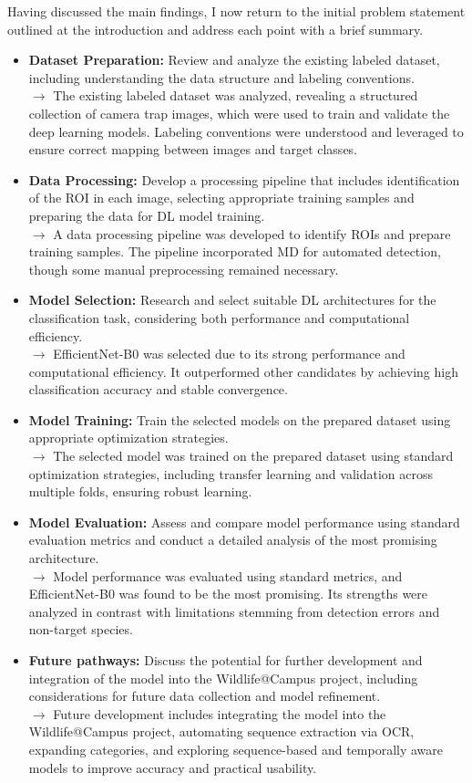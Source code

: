 Having discussed the main findings, I now return to the initial problem statement outlined at the introduction and address each point with a brief summary.
\begin{itemize}
    \item \textbf{Dataset Preparation:} Review and analyze the existing labeled dataset, including understanding the data structure and labeling conventions.\\
    $\rightarrow$ The existing labeled dataset was analyzed, revealing a structured collection of camera trap images, which were used to train and validate the deep learning models. Labeling conventions were understood and leveraged to ensure correct mapping between images and target classes.
    \item \textbf{Data Processing:} Develop a processing pipeline that includes identification of the \ac{ROI} in each image, selecting appropriate training samples and preparing the data for \ac{DL} model training.\\
    $\rightarrow$ A data processing pipeline was developed to identify \acp{ROI} and prepare training samples. The pipeline incorporated \ac{MD} for automated detection, though some manual preprocessing remained necessary.
    \item \textbf{Model Selection:} Research and select suitable \ac{DL} architectures for the classification task, considering both performance and computational efficiency.\\
    $\rightarrow$ EfficientNet-B0 was selected due to its strong performance and computational efficiency. It outperformed other candidates by achieving high classification accuracy and stable convergence.
    \item \textbf{Model Training:} Train the selected models on the prepared dataset using appropriate optimization strategies.\\
    $\rightarrow$ The selected model was trained on the prepared dataset using standard optimization strategies, including transfer learning and validation across multiple folds, ensuring robust learning.
    \item \textbf{Model Evaluation:} Assess and compare model performance using standard evaluation metrics and conduct a detailed analysis of the most promising architecture.\\
    $\rightarrow$ Model performance was evaluated using standard metrics, and EfficientNet-B0 was found to be the most promising. Its strengths were analyzed in contrast with limitations stemming from detection errors and non-target species.
    \item \textbf{Future pathways:} Discuss the potential for further development and integration of the model into the Wildlife@Campus project, including considerations for future data collection and model refinement.\\
    $\rightarrow$ Future development includes integrating the model into the Wildlife@Campus project, automating sequence extraction via OCR, expanding categories, and exploring sequence-based and temporally aware models to improve accuracy and practical usability.
\end{itemize}

